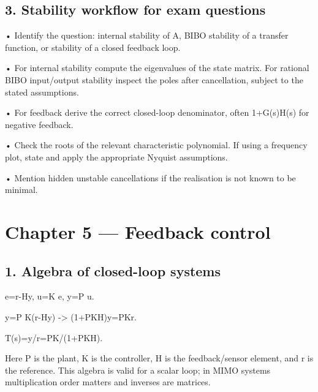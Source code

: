 \documentclass[11pt,a4paper]{article}
\begin{document}
\subsection{3. Stability workflow for exam questions}
\begin{studybox}• Identify the question: internal stability of A, BIBO stability of a transfer function, or stability of a closed feedback loop.\end{studybox}
\begin{studybox}• For internal stability compute the eigenvalues of the state matrix. For rational BIBO input/output stability inspect the poles after cancellation, subject to the stated assumptions.\end{studybox}
\begin{studybox}• For feedback derive the correct closed-loop denominator, often 1+G(s)H(s) for negative feedback.\end{studybox}
\begin{studybox}• Check the roots of the relevant characteristic polynomial. If using a frequency plot, state and apply the appropriate Nyquist assumptions.\end{studybox}
\begin{studybox}• Mention hidden unstable cancellations if the realisation is not known to be minimal.\end{studybox}

\section{Chapter 5 — Feedback control}

\subsection{1. Algebra of closed-loop systems}
\begin{equationbox}\raggedright
{\ttfamily\small e=r-Hy, u=K e, y=P u.}\par
\end{equationbox}
\begin{equationbox}\raggedright
{\ttfamily\small y=P K(r-Hy) -> (1+PKH)y=PKr.}\par
\end{equationbox}
\begin{equationbox}\raggedright
{\ttfamily\small T(s)=y/r=PK/(1+PKH).}\par
\end{equationbox}
\begin{conceptbox}Here P is the plant, K is the controller, H is the feedback/sensor element, and r is the reference. This algebra is valid for a scalar loop; in MIMO systems multiplication order matters and inverses are matrices.\end{conceptbox}
\end{document}

